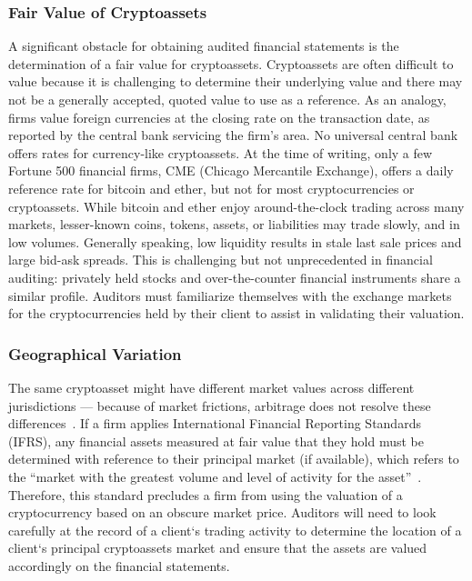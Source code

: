 \subsubsection{Fair Value of Cryptoassets}
A significant obstacle for obtaining audited financial statements is the determination of a fair value for cryptoassets. Cryptoassets are often difficult to value because it is challenging to determine their underlying value and there may not be a generally accepted, quoted value to use as a reference. As an analogy, firms value foreign currencies at the closing rate on the transaction date, as reported by the central bank servicing the firm's area. No universal central bank offers rates for currency-like cryptoassets. At the time of writing, only a few Fortune 500 financial firms, \eg CME (Chicago Mercantile Exchange), offers a daily reference rate for bitcoin and ether, but not for most cryptocurrencies or cryptoassets.
While bitcoin and ether enjoy around-the-clock trading across many markets, lesser-known coins, tokens, assets, or liabilities may trade slowly, and in low volumes. Generally speaking, low liquidity results in stale last sale prices and large bid-ask spreads. This is challenging but not unprecedented in financial auditing: privately held stocks and over-the-counter financial instruments share a similar profile. Auditors must familiarize themselves with the exchange markets for the cryptocurrencies held by their client to assist in validating their valuation.

\subsubsection{Geographical Variation}
The same cryptoasset might have different market values across different jurisdictions — because of market frictions, arbitrage does not resolve these differences~\cite{kroeger2017law}. If a firm applies International Financial Reporting Standards (IFRS), any financial assets measured at fair value that they hold must be determined with reference to their principal market (if available), which refers to the ``market with the greatest volume and level of activity for the asset''~\cite{ifrs13fairvalue}. Therefore, this standard precludes a firm from using the valuation of a cryptocurrency based on an obscure market price. Auditors will need to look carefully at the record of a client`s trading activity to determine the location of a client`s principal cryptoassets market and ensure that the assets are valued accordingly on the financial statements.


